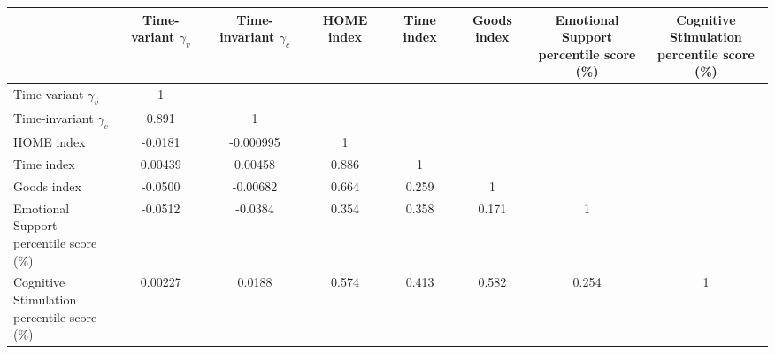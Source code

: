 {
\begin{tabular}{l*{7}{c}}
\hline\hline

          &\thead{Time-variant \\$\gamma_v$}         &\thead{Time-invariant \\$\gamma_c$}         &  \textbf{HOME index}         & \textbf{Time index}         &\textbf{Goods index}         &\thead{Emotional Support\\ percentile score (\%)}        &\thead{Cognitive Stimulation\\ percentile score (\%)}        \\
\hline
Time-variant $\gamma_v$&        1         &                  &                  &                  &                  &                  &                  \\
Time-invariant $\gamma_c$&    0.891\sym{***}&        1         &                  &                  &                  &                  &                  \\
HOME index   &  -0.0181         &-0.000995         &        1         &                  &                  &                  &                  \\
Time index  &  0.00439         &  0.00458         &    0.886\sym{***}&        1         &                  &                  &                  \\
Goods index &  -0.0500\sym{***}& -0.00682         &    0.664\sym{***}&    0.259\sym{***}&        1         &                  &                  \\
\makecell[l]{Emotional Support\\ percentile score (\%)} &  -0.0512\sym{***}&  -0.0384\sym{**} &    0.354\sym{***}&    0.358\sym{***}&    0.171\sym{***}&        1         &                  \\
\makecell[l]{Cognitive Stimulation\\ percentile score (\%)}&  0.00227         &   0.0188         &    0.574\sym{***}&    0.413\sym{***}&    0.582\sym{***}&    0.254\sym{***}&        1         \\
\hline\hline
\end{tabular}
}
